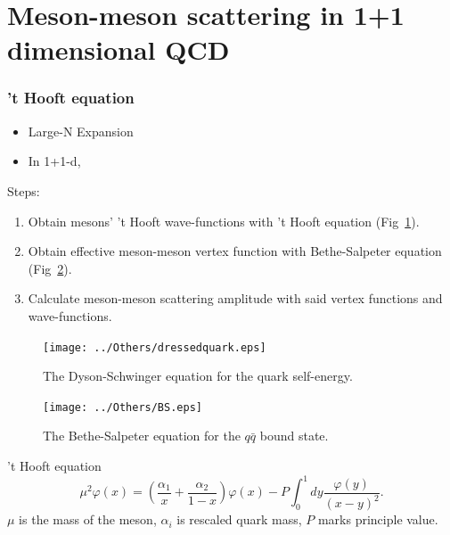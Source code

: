 \section{Meson-meson scattering in 1+1 dimensional QCD}

\begin{frame}
	\frametitle{'t Hooft equation}

	
	\begin{minipage}{0.48\textwidth}
		\begin{itemize}
			\item Large-N Expansion
			\item In 1+1-d, 
		\end{itemize}
	Steps: 
	\begin{enumerate}
		\item \small Obtain mesons' 't Hooft wave-functions with 't Hooft equation (Fig~\ref{dressedquark}). 
		\item Obtain effective meson-meson vertex function with Bethe-Salpeter equation (Fig~\ref{BSequation}). 
		\item Calculate meson-meson scattering amplitude with said vertex functions and wave-functions. 
	\end{enumerate}
	\end{minipage}
	\begin{minipage}{0.48\textwidth}
		\begin{figure}[hbt]
			\begin{center}
			  \texttt{[image: ../Others/dressedquark.eps]}\\
			  \caption{The Dyson-Schwinger equation for the quark self-energy. }\label{dressedquark}
			  \end{center}
		\end{figure}
		\begin{figure}[hbt]
			\begin{center}
			  \texttt{[image: ../Others/BS.eps]}\\
			  \caption{The Bethe-Salpeter equation for the $q\bar{q}$ bound state.}\label{BSequation}
			  \end{center}
		\end{figure}
	\end{minipage}

	\vspace*{1mm}

	't Hooft equation
	\begin{equation}
		\mu^2
		\varphi(x)=\left(\frac{\alpha_{1}}{x}+\frac{\alpha_{2}}{1-x}\right)\varphi(x)-P\int_0^1
		dy\frac{\varphi(y)}{(x-y)^2}.\label{teq}
	\end{equation}
	$\mu$ is the mass of the meson, $\alpha_i$ is rescaled quark mass, $P$ marks principle value. 

\end{frame}

